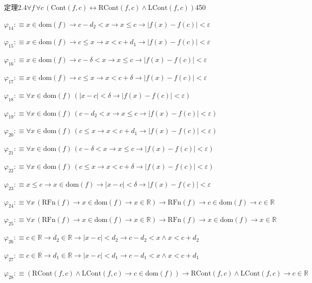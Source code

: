 \begin{fullproof}{定理2.4}{$\forall f\,\forall c\,(\mathrm{Cont}(f,c) \leftrightarrow \mathrm{RCont}(f,c) \land \mathrm{LCont}(f,c))$}{450}
\begin{abbrevlist}
\item $\varphi_{14} :\equiv x \in \mathrm{dom}(f) \to c - d_{2} < x \to x \leq c \to \lvert f(x) - f(c) \rvert < \varepsilon$
\item $\varphi_{15} :\equiv x \in \mathrm{dom}(f) \to c \leq x \to x < c + d_{1} \to \lvert f(x) - f(c) \rvert < \varepsilon$
\item $\varphi_{16} :\equiv x \in \mathrm{dom}(f) \to c - \delta < x \to x \leq c \to \lvert f(x) - f(c) \rvert < \varepsilon$
\item $\varphi_{17} :\equiv x \in \mathrm{dom}(f) \to c \leq x \to x < c + \delta \to \lvert f(x) - f(c) \rvert < \varepsilon$
\item $\varphi_{18} :\equiv \forall x \in \mathrm{dom}(f)\,(\lvert x - c \rvert < \delta \to \lvert f(x) - f(c) \rvert < \varepsilon)$
\item $\varphi_{19} :\equiv \forall x \in \mathrm{dom}(f)\,(c - d_{2} < x \to x \leq c \to \lvert f(x) - f(c) \rvert < \varepsilon)$
\item $\varphi_{20} :\equiv \forall x \in \mathrm{dom}(f)\,(c \leq x \to x < c + d_{1} \to \lvert f(x) - f(c) \rvert < \varepsilon)$
\item $\varphi_{21} :\equiv \forall x \in \mathrm{dom}(f)\,(c - \delta < x \to x \leq c \to \lvert f(x) - f(c) \rvert < \varepsilon)$
\item $\varphi_{22} :\equiv \forall x \in \mathrm{dom}(f)\,(c \leq x \to x < c + \delta \to \lvert f(x) - f(c) \rvert < \varepsilon)$
\item $\varphi_{23} :\equiv x \leq c \to x \in \mathrm{dom}(f) \to \lvert x - c \rvert < \delta \to \lvert f(x) - f(c) \rvert < \varepsilon$
\item $\varphi_{24} :\equiv \forall x\,(\mathrm{RFn}(f) \to x \in \mathrm{dom}(f) \to x \in \mathbb{R}) \to \mathrm{RFn}(f) \to c \in \mathrm{dom}(f) \to c \in \mathbb{R}$
\item $\varphi_{25} :\equiv \forall x\,(\mathrm{RFn}(f) \to x \in \mathrm{dom}(f) \to x \in \mathbb{R}) \to \mathrm{RFn}(f) \to x \in \mathrm{dom}(f) \to x \in \mathbb{R}$
\item $\varphi_{26} :\equiv c \in \mathbb{R} \to d_{2} \in \mathbb{R} \to \lvert x - c \rvert < d_{2} \to c - d_{2} < x \land x < c + d_{2}$
\item $\varphi_{27} :\equiv c \in \mathbb{R} \to d_{1} \in \mathbb{R} \to \lvert x - c \rvert < d_{1} \to c - d_{1} < x \land x < c + d_{1}$
\item $\varphi_{28} :\equiv (\mathrm{RCont}(f,c) \land \mathrm{LCont}(f,c) \to c \in \mathrm{dom}(f)) \to \mathrm{RCont}(f,c) \land \mathrm{LCont}(f,c) \to c \in \mathbb{R}$

\end{abbrevlist}
\end{fullproof}
